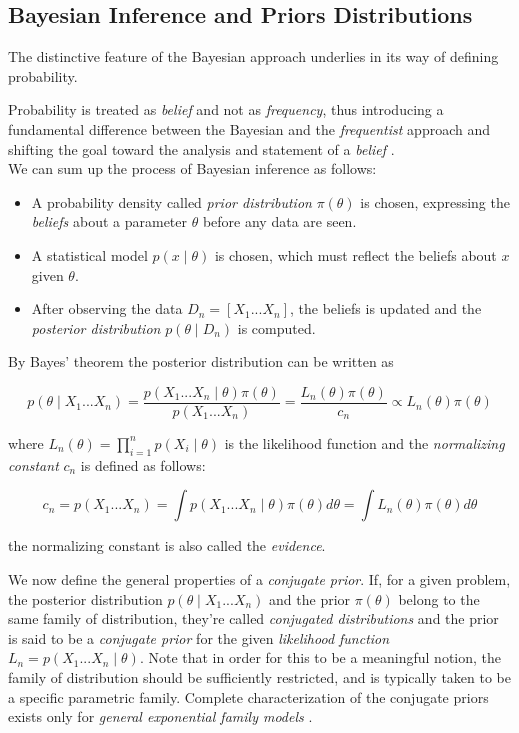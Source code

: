 \documentclass[12pt,openright,twoside,a4paper]{book}
\begin{document}
\subsection{Bayesian Inference and Priors Distributions}

The distinctive feature of the Bayesian approach underlies in its way of defining probability.

Probability is treated as \textit{belief} and not as \textit{frequency}, thus introducing a fundamental difference between the Bayesian and the \textit{frequentist} approach and shifting the goal toward the analysis and statement of a \textit{belief} \cite{SML}.
\\[12pt]
We can sum up the process of Bayesian inference as follows:
\begin{itemize}
\item A probability density called \textit{prior distribution} $\pi(\theta)$ is chosen, expressing the \textit{beliefs} about a parameter $\theta$ before any data are seen.
\item A statistical model $p(x\mid \theta)$ is chosen, which must reflect the beliefs about $x$ given $\theta$.
\item After observing the data $D_n=[X_1...X_n]$, the beliefs is updated and the \textit{posterior distribution} $p(\theta\mid D_n)$ is computed.
\end{itemize}

By Bayes' theorem the posterior distribution can be written as 

\begin{equation}
p(\theta\mid X_1...X_n)= \frac{p(X_1...X_n\mid \theta)\pi(\theta)}{p(X_1...X_n)}=\frac{L_n(\theta)\pi(\theta)}{c_n}\propto L_n(\theta)\pi(\theta)
\label{bayest}
\end{equation}

where $L_n(\theta)=\prod_{i=1}^n p(X_i\mid \theta)$ is the likelihood function and the \textit{normalizing constant} $c_n$ is defined as follows:

\begin{equation}
c_n=p(X_1...X_n)=\int p(X_1...X_n\mid \theta)\pi(\theta)d\theta=\int L_n(\theta)\pi(\theta)d\theta
\label{cnorm}
\end{equation}

the normalizing constant is also called the \textit{evidence}.

We now define the general properties of a \textit{conjugate prior}.
If, for a given problem, the posterior distribution $p(\theta\mid X_1...X_n)$ and the prior $\pi(\theta)$ belong to the same family of distribution, they're called \textit{conjugated distributions} and the prior is said to be a \textit{conjugate prior} for the given \textit{likelihood function} $L_n=p(X_1...X_n\mid \theta)$.
Note that in order for this to be a meaningful notion, the family of distribution should be sufficiently restricted, and is typically taken to be a specific parametric family.
Complete characterization of the conjugate priors exists only for \textit{general exponential family models} \cite{SML}.
 
\end{document}
